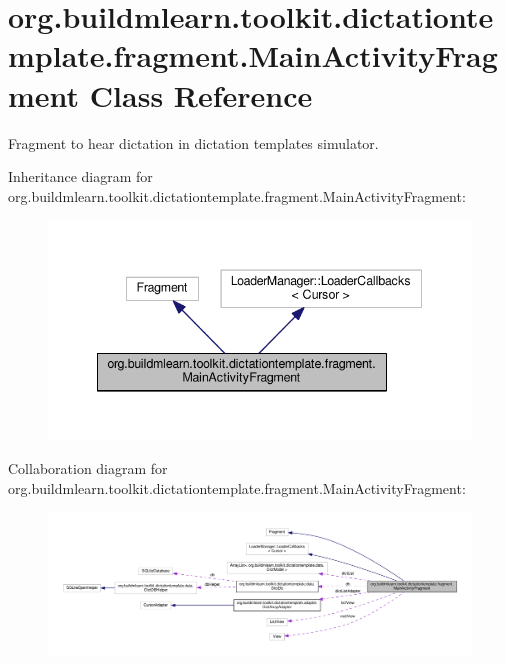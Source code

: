 \hypertarget{classorg_1_1buildmlearn_1_1toolkit_1_1dictationtemplate_1_1fragment_1_1MainActivityFragment}{}\section{org.\+buildmlearn.\+toolkit.\+dictationtemplate.\+fragment.\+Main\+Activity\+Fragment Class Reference}
\label{classorg_1_1buildmlearn_1_1toolkit_1_1dictationtemplate_1_1fragment_1_1MainActivityFragment}


Fragment to hear dictation in dictation template\textquotesingle{}s simulator.  




Inheritance diagram for org.\+buildmlearn.\+toolkit.\+dictationtemplate.\+fragment.\+Main\+Activity\+Fragment\+:
\nopagebreak
\begin{figure}[H]
\begin{center}
\leavevmode
\includegraphics[width=342pt]{classorg_1_1buildmlearn_1_1toolkit_1_1dictationtemplate_1_1fragment_1_1MainActivityFragment__inherit__graph}
\end{center}
\end{figure}


Collaboration diagram for org.\+buildmlearn.\+toolkit.\+dictationtemplate.\+fragment.\+Main\+Activity\+Fragment\+:
\nopagebreak
\begin{figure}[H]
\begin{center}
\leavevmode
\includegraphics[width=350pt]{classorg_1_1buildmlearn_1_1toolkit_1_1dictationtemplate_1_1fragment_1_1MainActivityFragment__coll__graph}
\end{center}
\end{figure}
